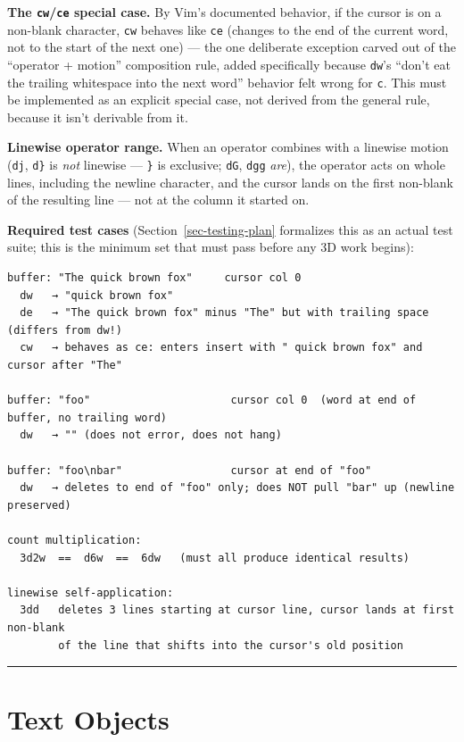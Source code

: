 \documentclass[11pt]{article}
\begin{document}
\textbf{The \texttt{cw}/\texttt{ce} special case.} By Vim's documented behavior, if the cursor
is on a non-blank character, \texttt{cw} behaves like \texttt{ce} (changes to the end of
the current word, not to the start of the next one) --- the one deliberate
exception carved out of the ``operator + motion'' composition rule, added
specifically because \texttt{dw}'s ``don't eat the trailing whitespace into the next
word'' behavior felt wrong for \texttt{c}. This must be implemented as an explicit
special case, not derived from the general rule, because it isn't derivable
from it.

\textbf{Linewise operator range.} When an operator combines with a linewise
motion (\texttt{dj}, \texttt{d\}} is \emph{not} linewise --- \texttt{\}} is exclusive; \texttt{dG}, \texttt{dgg} \emph{are}),
the operator acts on whole lines, including the newline character, and the
cursor lands on the first non-blank of the resulting line --- not at the
column it started on.

\textbf{Required test cases} (Section~\ref{sec-testing-plan} formalizes this as an actual test
suite; this is the minimum set that must pass before any 3D work begins):

\begin{Verbatim}[breaklines=true, breakanywhere=true, fontsize=\small]
buffer: "The quick brown fox"     cursor col 0
  dw   → "quick brown fox"
  de   → "The quick brown fox" minus "The" but with trailing space (differs from dw!)
  cw   → behaves as ce: enters insert with " quick brown fox" and cursor after "The"

buffer: "foo"                      cursor col 0  (word at end of buffer, no trailing word)
  dw   → "" (does not error, does not hang)

buffer: "foo\nbar"                 cursor at end of "foo"
  dw   → deletes to end of "foo" only; does NOT pull "bar" up (newline preserved)

count multiplication:
  3d2w  ==  d6w  ==  6dw   (must all produce identical results)

linewise self-application:
  3dd   deletes 3 lines starting at cursor line, cursor lands at first non-blank
        of the line that shifts into the cursor's old position
\end{Verbatim}

\begin{center}\rule{0.5\linewidth}{0.5pt}\end{center}

\hypertarget{sec-text-objects}{%
\section{Text Objects}\label{sec-text-objects}}
\end{document}
